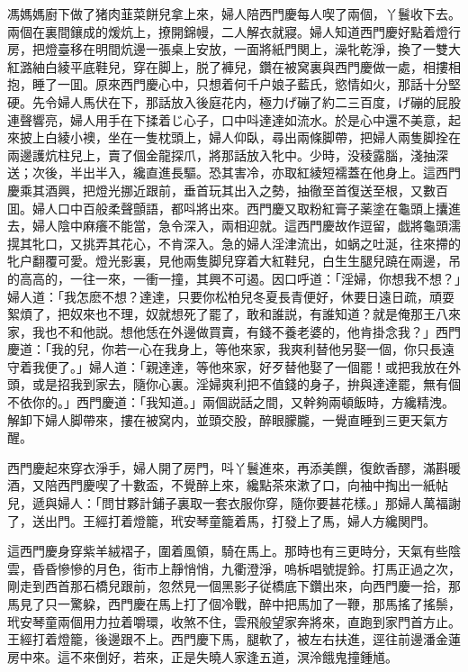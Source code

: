 馮媽媽廚下做了猪肉韮菜餅兒拿上來，婦人陪西門慶每人喫了兩個，丫鬟收下去。兩個在裏間鑲成的煖炕上，撩開錦幔，二人解衣就寢。婦人知道西門慶好點着燈行房，把燈臺移在明間炕邊一張桌上安放，一面將紙門関上，澡牝乾淨，換了一雙大紅潞紬白綾平底鞋兒，穿在脚上，脱了褲兒，鑽在被窝裏與西門慶做一處，相摟相抱，睡了一囬。原來西門慶心中，只想着何千户娘子藍氏，慾情如火，那話十分堅硬。先令婦人馬伏在下，那話放入後庭花内，極力げ磞了約二三百度，げ磞的屁股連聲響亮，婦人用手在下揉着じ心子，口中呌達達如流水。於是心中還不美意，起來披上白綾小襖，坐在一隻枕頭上，婦人仰臥，尋出兩條脚帶，把婦人兩隻脚拴在兩邊護炕柱兒上，賣了個金龍探爪，將那話放入牝中。少時，没稜露腦，淺抽深送；次後，半出半入，纔直進長驅。恐其害冷，亦取紅綾短襦蓋在他身上。這西門慶乘其酒興，把燈光挪近跟前，垂首玩其出入之勢，抽徹至首復送至根，又數百囬。婦人口中百般柔聲顫語，都呌將出來。西門慶又取粉紅膏子薬塗在龜頭上攮進去，婦人陰中麻癢不能當，急令深入，兩相迎就。這西門慶故作逗留，戯將龜頭濡㨪其牝口，又挑弄其花心，不肯深入。急的婦人淫津流出，如蜗之吐涎，往來摕的牝户翻覆可愛。燈光影裏，見他兩隻脚兒穿着大紅鞋兒，白生生腿兒蹺在兩邊，吊的高高的，一往一來，一衝一撞，其興不可遏。因口呼道：「淫婦，你想我不想？」婦人道：「我怎麽不想？達達，只要你松柏兒冬夏長青便好，休要日遠日疏，頑耍絮煩了，把奴來也不理，奴就想死了罷了，敢和誰説，有誰知道？就是俺那王八來家，我也不和他説。想他恁在外邊做買賣，有錢不養老婆的，他肯掛念我？」西門慶道：「我的兒，你若一心在我身上，等他來家，我爽利替他另娶一個，你只長遠守着我便了。」婦人道：「親達達，等他來家，好歹替他娶了一個罷！或把我放在外頭，或是招我到家去，隨你心裏。淫婦爽利把不值錢的身子，拚與達達罷，無有個不依你的。」西門慶道：「我知道。」兩個説話之間，又幹夠兩頓飯時，方纔精洩。解卸下婦人脚帶來，摟在被窝内，並頭交股，醉眼朦朧，一覺直睡到三更天氣方醒。

西門慶起來穿衣淨手，婦人開了房門，呌丫鬟進來，再添美饌，復飲香醪，滿斟暖酒，又陪西門慶喫了十數盃，不覺醉上來，纔點茶來漱了口，向袖中掏出一紙帖兒，遞與婦人：「問甘夥計鋪子裏取一套衣服你穿，隨你要甚花樣。」那婦人萬福謝了，送出門。王經打着燈籠，玳安琴童籠着馬，打發上了馬，婦人方纔関門。

這西門慶身穿紫羊絨褶子，圍着風領，騎在馬上。那時也有三更時分，天氣有些陰雲，昏昏慘慘的月色，街巿上靜悄悄，九衢澄淨，嗚柝唱號提鈴。打馬正過之次，剛走到西首那石橋兒跟前，忽然見一個黑影子従橋底下鑽出來，向西門慶一拾，那馬見了只一驚躱，西門慶在馬上打了個冷戰，醉中把馬加了一鞭，那馬搖了搖鬃，玳安琴童兩個用力拉着嚼環，收煞不住，雲飛般望家奔將來，直跑到家門首方止。王經打着燈籠，後邊跟不上。西門慶下馬，腿軟了，被左右扶進，逕往前邊潘金蓮房中來。這不來倒好，若來，正是失曉人家逢五道，溟泠餓鬼撞鍾馗。

